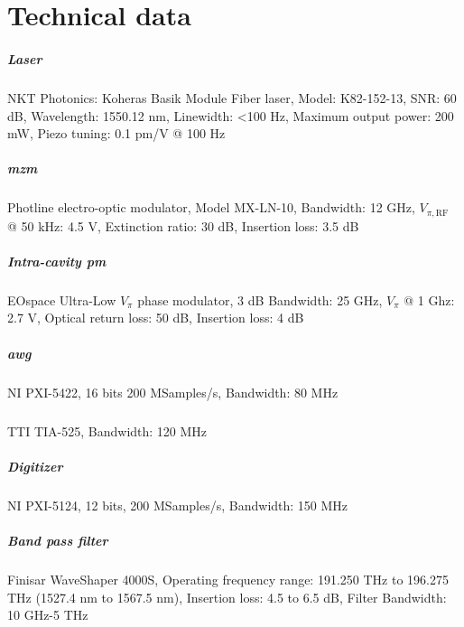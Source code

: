 \chapter{Technical data}

\label{app-data}

\paragraph{Laser} NKT Photonics: Koheras Basik Module Fiber laser, Model: K82-152-13, SNR: 60 dB, Wavelength: 1550.12 nm, Linewidth: <100 Hz, Maximum output power: 200 mW, Piezo tuning: 0.1 pm/V @ 100 Hz \cite{laser}

\paragraph{\acrlong{mzm}} Photline electro-optic modulator, Model MX-LN-10,
Bandwidth: 12 GHz, $V_{\pi,\text{RF}}$ @ 50 kHz: 4.5 V, Extinction ratio: 30 dB, Insertion loss: 3.5 dB \cite{mzm}

\paragraph{Intra-cavity \acrlong{pm}} EOspace Ultra-Low $V_\pi$ phase modulator, 3 dB Bandwidth: 25 GHz, $V_\pi$ @ 1 Ghz: 2.7 V, Optical return loss: 50 dB, Insertion loss: 4 dB \cite{AkroutAkram2016Pprc}

\paragraph{\acrlong{awg}} NI PXI-5422, 16 bits 200 MSamples/s, Bandwidth: 80 MHz \cite{ni-pxi}

\paragraph{} TTI TIA-525, Bandwidth: 120 MHz \cite{pd}

\paragraph{Digitizer} NI PXI-5124, 12 bits, 200 MSamples/s, Bandwidth: 150 MHz \cite{ni-digitizer}

\paragraph{Band pass filter} Finisar WaveShaper 4000S, Operating frequency range: 191.250 THz to 196.275 THz (1527.4 nm to 1567.5 nm), Insertion loss: 4.5 to 6.5 dB, Filter Bandwidth: 10 GHz-5 THz \cite{wave-shaper}


